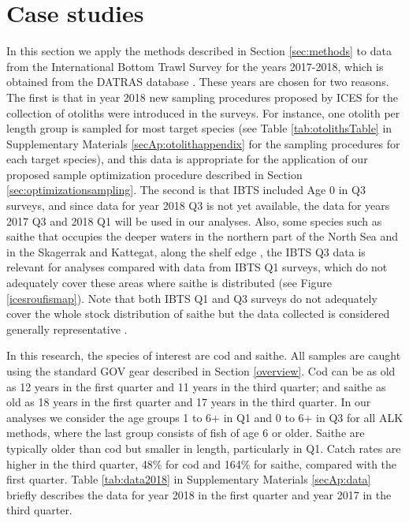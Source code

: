 \documentclass[a4paper 12pt]{article}
\numberwithin{equation}{section}
\begin{document}
{\section{Case studies}
\label{sec:data}
In this section we apply the methods described in Section \ref{sec:methods} to data from the International Bottom Trawl Survey for the years 2017-2018, which is obtained from the DATRAS database \citep{datras}. These years are chosen for two reasons. The first is that in year 2018 new sampling procedures proposed by ICES for the collection of otoliths were introduced in the surveys. For instance, one otolith per length group is sampled for most target species (see Table \ref{tab:otolithsTable} in Supplementary Materials \ref{secAp:otolithappendix} for the sampling procedures for each target species), and this data is appropriate for the application of our proposed sample optimization procedure described in Section \ref{sec:optimizationsampling}. The second is that IBTS included Age 0 in Q3 surveys, and since data for year 2018 Q3 is not yet available, the data for years 2017 Q3 and 2018 Q1 will be used in our analyses. Also, some species such as saithe that occupies the deeper waters in the northern part of the North Sea and in the Skagerrak and Kattegat, along the shelf edge \citep{ICESFishMaps}, the IBTS Q3 data is relevant for analyses compared with data from IBTS Q1 surveys, which do not adequately cover these areas where saithe is distributed (see Figure \ref{icesroufismap}). Note that both IBTS Q1 and Q3 surveys do not adequately cover the whole stock distribution of saithe but the data collected is considered generally representative \citep{ICESJune2016}.

In this research, the species of interest are cod and saithe. All samples are caught using the standard GOV gear described in Section \ref{overview}.  Cod can be as old as 12 years in the first quarter and 11 years in the third quarter; and saithe as old as 18 years in the first quarter and 17 years in the third quarter. In our analyses we consider the age groups 1 to 6+ in Q1 and 0 to 6+ in Q3 for all ALK methods, where the last group consists of fish of age 6 or older. Saithe are typically older than cod but smaller in length, particularly in Q1. Catch rates are higher in the third quarter, 48\% for cod and 164\% for saithe, compared with the first quarter. Table \ref{tab:data2018} in Supplementary Materials \ref{secAp:data} briefly describes the data for year 2018 in the first quarter and year 2017 in the third quarter.

}
\end{document}
